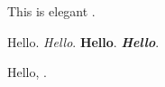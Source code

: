 \documentclass[utf,withchinese,withisomath]{elegant}
\begin{document}
This is elegant \elegantversion{}.

Hello. \textit{Hello}. \textbf{Hello}. \textbf{\textit{Hello}}.

Hello, \XeLaTeX{}.
\end{document}
